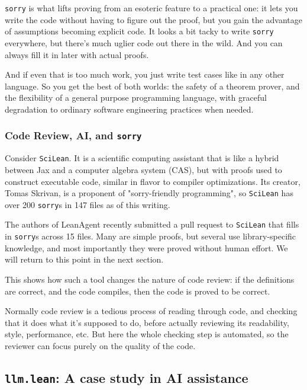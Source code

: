 \documentclass{article}
\begin{document}
\texttt{sorry} is what lifts proving from an esoteric feature to a practical one: it lets you write the code without having to figure out the proof, but you gain the advantage of assumptions becoming explicit code. It looks a bit tacky to write \texttt{sorry} everywhere, but there's much uglier code out there in the wild. And you can always fill it in later with actual proofs.

And if even that is too much work, you just write test cases like in any other language. So you get the best of both worlds: the safety of a theorem prover, and the flexibility of a general purpose programming language, with graceful degradation to ordinary software engineering practices when needed.

\subsubsection{Code Review, AI, and \texttt{sorry}}

Consider \texttt{SciLean}. It is a scientific computing assistant that is like a hybrid between Jax and a computer algebra system (CAS), but with proofs used to construct executable code, similar in flavor to compiler optimizations. Its creator, Tomas Skrivan, is a proponent of "sorry-friendly programming", so \texttt{SciLean} has over 200 \texttt{sorry}s in 147 files as of this writing.

The authors of LeanAgent recently submitted a pull request to \texttt{SciLean} that fills in \texttt{sorry}s across 15 files. Many are simple proofs, but several use library-specific knowledge, and most importantly they were proved without human effort. We will return to this point in the next section.


This shows how such a tool changes the nature of code review: if the definitions are correct, and the code compiles, then the code is proved to be correct.

Normally code review is a tedious process of reading through code, and checking that it does what it's supposed to do, before actually reviewing its readability, style, performance, etc. But here the whole checking step is automated, so the reviewer can focus purely on the quality of the code.

\subsection{\texttt{llm.lean}: A case study in AI assistance}
\end{document}
